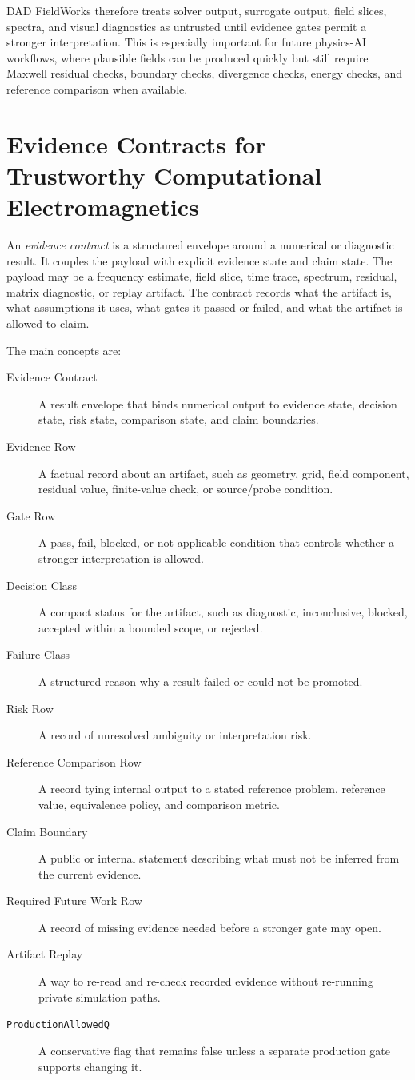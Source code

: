 \documentclass[11pt,a4paper]{article}
\newcommand{\code}[1]{\texttt{#1}}
\begin{document}
DAD FieldWorks therefore treats solver output, surrogate output, field slices, spectra, and visual diagnostics as untrusted until evidence gates permit a stronger interpretation. This is especially important for future physics-AI workflows, where plausible fields can be produced quickly but still require Maxwell residual checks, boundary checks, divergence checks, energy checks, and reference comparison when available.

\section{Evidence Contracts for Trustworthy Computational Electromagnetics}

An \emph{evidence contract} is a structured envelope around a numerical or diagnostic result. It couples the payload with explicit evidence state and claim state. The payload may be a frequency estimate, field slice, time trace, spectrum, residual, matrix diagnostic, or replay artifact. The contract records what the artifact is, what assumptions it uses, what gates it passed or failed, and what the artifact is allowed to claim.

The main concepts are:

\begin{description}
  \item[Evidence Contract] A result envelope that binds numerical output to evidence state, decision state, risk state, comparison state, and claim boundaries.
  \item[Evidence Row] A factual record about an artifact, such as geometry, grid, field component, residual value, finite-value check, or source/probe condition.
  \item[Gate Row] A pass, fail, blocked, or not-applicable condition that controls whether a stronger interpretation is allowed.
  \item[Decision Class] A compact status for the artifact, such as diagnostic, inconclusive, blocked, accepted within a bounded scope, or rejected.
  \item[Failure Class] A structured reason why a result failed or could not be promoted.
  \item[Risk Row] A record of unresolved ambiguity or interpretation risk.
  \item[Reference Comparison Row] A record tying internal output to a stated reference problem, reference value, equivalence policy, and comparison metric.
  \item[Claim Boundary] A public or internal statement describing what must not be inferred from the current evidence.
  \item[Required Future Work Row] A record of missing evidence needed before a stronger gate may open.
  \item[Artifact Replay] A way to re-read and re-check recorded evidence without re-running private simulation paths.
  \item[\code{ProductionAllowedQ}] A conservative flag that remains false unless a separate production gate supports changing it.
\end{description}
\end{document}
